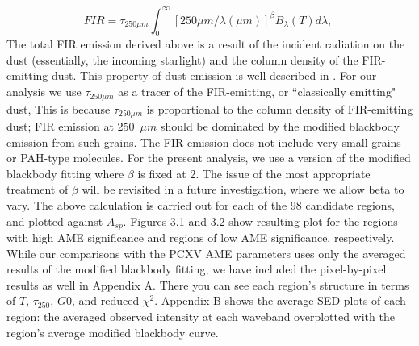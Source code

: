 \begin{equation}
\label{FIR}
FIR = \tau_{250\mu m} \int_{0}^{\infty} [250\mu m/\lambda(\mu m)]^{\beta}
B_{\lambda}(T) d\lambda ,\;
\end{equation}
     The total FIR emission derived above is a result of the incident radiation on the dust (essentially, the incoming starlight) and the column density of the FIR-emitting dust. This property of dust emission is well-described in \cite{onaka00}. For our analysis we use $\tau_{250\mu m}$ as a tracer of the FIR-emitting, or ``classically emitting" dust, This is because $\tau_{250\mu m}$ is proportional to the column density of FIR-emitting dust; FIR emission at 250~$\mu m$ should be dominated by the modified blackbody emission from such grains. The FIR emission does not include very small grains or PAH-type molecules. 
     For the present analysis, we use a version of the modified blackbody fitting where $\beta$ is fixed at 2. The issue of the most appropriate treatment of $\beta$ will be revisited in a future investigation, where we allow beta to vary.
     The above calculation is carried out for each of the 98 candidate regions, and plotted against $A_{sp}$. Figures 3.1 and 3.2 show resulting plot for the regions with high AME significance and regions of low AME significance, respectively. While our comparisons with the PCXV AME parameters uses only the averaged results of the modified blackbody fitting, we have included the pixel-by-pixel results as well in Appendix A. There you can see each region's structure in terms of $T$, $\tau_{250}$, $G0$, and reduced $\chi^2$. Appendix B shows the average SED plots of each region: the averaged observed intensity at each waveband overplotted with the region's average modified blackbody curve.

     
